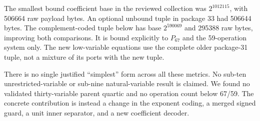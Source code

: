 The smallest bound coefficient base in the reviewed collection was $2^{1012115}$, with 506664 raw payload bytes. An optional unbound tuple in package 33 had 506644 bytes. The complement-coded tuple below has base $2^{590069}$ and 295388 raw bytes, improving both comparisons. It is bound explicitly to $P_{67}$ and the 59-operation system only. The new low-variable equations use the complete older package-31 tuple, not a mixture of its ports with the new tuple.

There is no single justified ``simplest'' form across all these metrics. No sub-ten unrestricted-variable or sub-nine natural-variable result is claimed. We found no validated thirty-variable parent quartic and no operation count below 67/59. The concrete contribution is instead a change in the exponent coding, a merged signed guard, a unit inner separator, and a new coefficient decoder.
